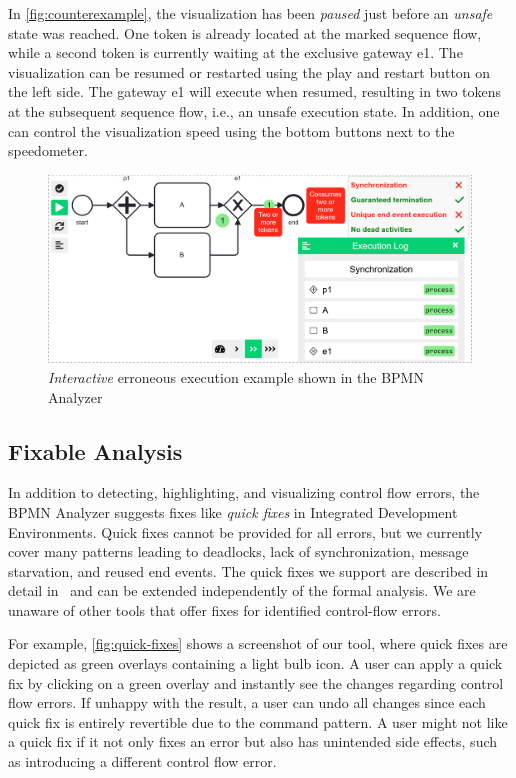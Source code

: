 \documentclass[
onecolumn, %
]{ceurart}
\begin{document}
In \autoref{fig:counterexample}, the visualization has been \textit{paused} just before an \textit{unsafe} state was reached.
One token is already located at the marked sequence flow, while a second token is currently waiting at the exclusive gateway \textsf{e1}.
The visualization can be resumed or restarted using the play and restart button on the left side.
The gateway \textsf{e1} will execute when resumed, resulting in two tokens at the subsequent sequence flow, i.e., an unsafe execution state.
In addition, one can control the visualization speed using the bottom buttons next to the speedometer.

\begin{figure}[ht]
	\centering
	\includegraphics[width=0.6\linewidth]{images/counter-example}
	\caption{\textit{Interactive} erroneous execution example shown in the BPMN Analyzer}
	\label{fig:counterexample}
\end{figure}

\subsection{Fixable Analysis}
In addition to detecting, highlighting, and visualizing control flow errors, the BPMN Analyzer suggests fixes like \textit{quick fixes} in Integrated Development Environments.
Quick fixes cannot be provided for all errors, but we currently cover many patterns leading to deadlocks, lack of synchronization, message starvation, and reused end events.
The quick fixes we support are described in detail in~\cite{krauterInstantaneousComprehensibleFixable2024} and can be extended independently of the formal analysis.
We are unaware of other tools that offer fixes for identified control-flow errors.

For example, \autoref{fig:quick-fixes} shows a screenshot of our tool, where quick fixes are depicted as green overlays containing a light bulb icon.
A user can apply a quick fix by clicking on a green overlay and instantly see the changes regarding control flow errors.
If unhappy with the result, a user can undo all changes since each quick fix is entirely revertible due to the command pattern.
A user might not like a quick fix if it not only fixes an error but also has unintended side effects, such as introducing a different control flow error.
\end{document}

